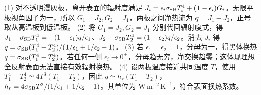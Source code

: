 (1) 对不透明漫灰板，离开表面的辐射度满足 \(J_i=\epsilon_i\sigma_{\rm SB}T_i^4+(1-\epsilon_i)G_i\)。无限平板视角因子为一，所以 \(G_1=J_2,G_2=J_1\)，两板之间净热流为 \(q=J_1-J_2\)，正号取从高温板到低温板。
(2) 将 \(G_1=J_2,G_2=J_1\) 分别代回辐射度式，得 \(J_1-\sigma_{\rm SB}T_1^4=-(1-\epsilon_1)q/\epsilon_1\)、\(J_2-\sigma_{\rm SB}T_2^4=(1-\epsilon_2)q/\epsilon_2\)。消去 \(J_i\) 得 \(q=\sigma_{\rm SB}(T_1^4-T_2^4)/(1/\epsilon_1+1/\epsilon_2-1)\)。
(3) 若 \(\epsilon_1=\epsilon_2=1\)，分母为一，得黑体换热 \(q=\sigma_{\rm SB}(T_1^4-T_2^4)\)。若任何一侧 \(\epsilon_i\to0^+\)，分母趋无穷，净交换趋零；这体现理想全反射表面无法直接有效辐射换热。
(4) 设两板温度接近共同温度 \(T\)，使用 \(T_1^4-T_2^4\simeq4T^3(T_1-T_2)\)，因此 \(q\simeq h_r(T_1-T_2)\)，\(h_r=4\sigma_{\rm SB}T^3/(1/\epsilon_1+1/\epsilon_2-1)\)。其单位为 \(\mathrm{W\,m^{-2}\,K^{-1}}\)，符合表面换热系数。
